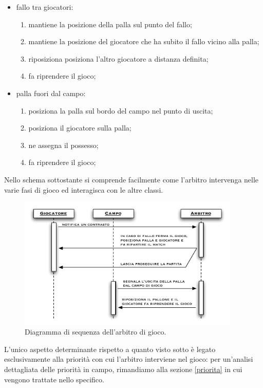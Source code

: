 \documentclass[aps,letterpaper,10pt]{article}
\begin{document}
\begin{itemize}
	\item fallo tra giocatori:
	\begin{enumerate}
		\item mantiene la posizione della palla sul punto del fallo;
		\item mantiene la posizione del giocatore che ha subito il fallo vicino alla palla;
		\item riposiziona posiziona l'altro giocatore a distanza definita;
		\item fa riprendere il gioco;
	\end{enumerate}
	\item palla fuori dal campo:
	\begin{enumerate}
		\item posiziona la palla sul bordo del campo nel punto di uscita;
		\item posiziona il giocatore sulla palla;
		\item ne assegna il possesso;
		\item fa riprendere il gioco;
	\end{enumerate}
\end{itemize}

Nello schema sottostante si comprende facilmente come l'arbitro intervenga nelle varie fasi di gioco ed interagisca con
le altre classi.

\begin{figure}[H]
	\begin{center}
		\includegraphics[width=400px]{images/referee-sequence.pdf}
	\end{center}
\caption{Diagramma di sequenza dell'arbitro di gioco.}
\end{figure}

L'unico aspetto determinante rispetto a quanto visto sotto \`e legato esclusivamente alla priorit\`a con cui l'arbitro
interviene nel gioco: per un'analisi dettagliata delle priorit\`a in campo, rimandiamo alla sezione \ref{priorita} in
cui vengono trattate nello specifico.
\end{document}
